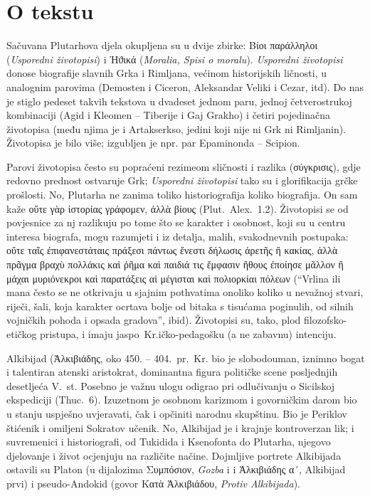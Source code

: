 
\section*{O tekstu}

Sačuvana Plutarhova djela okupljena su u dvije zbirke: Βίοι παράλληλοι (\textit{Usporedni životopisi}) i Ἠϑικά (\textit{Moralia, Spisi o moralu}). \textit{Usporedni životopisi} donose biografije slavnih Grka i Rimljana, većinom historijskih ličnosti, u analognim parovima (Demosten i Ciceron, Aleksandar Veliki i Cezar, itd). Do nas je stiglo pedeset takvih tekstova u dvadeset jednom paru, jednoj četverostrukoj kombinaciji (Agid i Kleomen – Tiberije i Gaj Grakho) i četiri pojedinačna životopisa (među njima je i Artakserkso, jedini koji nije ni Grk ni Rimljanin). Životopisa je bilo više; izgubljen je npr. par Epaminonda – Scipion.

Parovi životopisa često su popraćeni rezimeom sličnosti i razlika \textgreek[variant=ancient]{(σύγκρισις),} gdje redovno prednost ostvaruje Grk; \textit{Usporedni životopisi} tako su i glorifikacija grčke prošlosti. No, Plutarha ne zanima toliko historiografija koliko biografija. On sam kaže \textgreek[variant=ancient]{οὔτε γὰρ ἱστορίας γράφομεν, ἀλλὰ βίους} (Plut.\ Alex.~1.2). Životopisi se od povjesnice za nj razlikuju po tome što se karakter i osobnost, koji su u centru interesa biografa, mogu razumjeti i iz detalja, malih, svakodnevnih postupaka: \textgreek[variant=ancient]{οὔτε ταῖς ἐπιφανεστάταις πράξεσι πάντως ἔνεστι δήλωσις ἀρετῆς ἢ κακίας, ἀλλὰ πρᾶγμα βραχὺ πολλάκις καὶ ῥῆμα καὶ παιδιά τις ἔμφασιν ἤθους ἐποίησε μᾶλλον ἢ μάχαι μυριόνεκροι καὶ παρατάξεις αἱ μέγισται καὶ πολιορκίαι πόλεων} (``Vrlina ili mana često se ne otkrivaju u sjajnim pothvatima onoliko koliko u nevažnoj stvari, riječi, šali, koja karakter ocrtava bolje od bitaka s tisućama poginulih, od silnih vojničkih pohoda i opsada gradova'', ibid). Životopisi su, tako, plod filozofsko-etičkog pristupa, i imaju jaspo~Kr.ičko-pedagošku (a ne zabavnu) intenciju. 

Alkibijad (Ἀλκιβιάδης, oko 450. – 404.\ pr.~Kr. bio je slobodouman, iznimno bogat i talentiran atenski aristokrat, dominantna figura političke scene posljednjih desetljeća V.\ st. Posebno je važnu ulogu odigrao pri odlučivanju o Sicilskoj ekspediciji (Thuc.~6). Izuzetnom je osobnom karizmom i govorničkim darom bio u stanju uspješno uvjeravati, čak i opčiniti narodnu skupštinu. Bio je Periklov štićenik i omiljeni Sokratov učenik. No, Alkibijad je i krajnje kontroverzan lik; i suvremenici i historiografi, od Tukidida i Ksenofonta do Plutarha, njegovo djelovanje i život ocjenjuju na različite načine. Dojmljive portrete Alkibijada ostavili su Platon (u dijalozima \textgreek[variant=ancient]{Συμπόσιον,} \textit{Gozba} i i \textgreek{Ἀλκιβιάδης α´,} Alkibijad prvi) i pseudo-Andokid (govor \textgreek[variant=ancient]{Κατὰ Ἀλκιβιάδου,} \textit{Protiv Alkibijada}).

